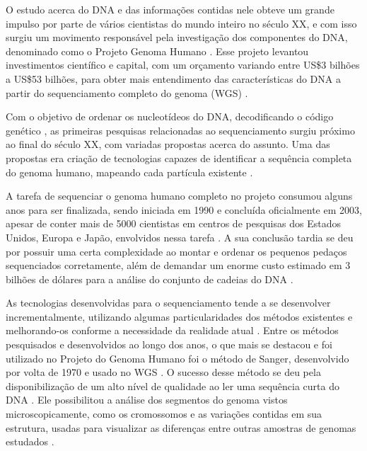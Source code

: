 O estudo acerca do DNA e das informações contidas nele obteve um grande impulso por parte de vários cientistas do mundo inteiro no século XX, e com isso surgiu um movimento responsável pela investigação dos componentes do DNA, denominado como o Projeto Genoma Humano \cite{Lander2001}. Esse projeto levantou investimentos científico e capital, com um orçamento variando entre US\$3 bilhões a US\$53 bilhões, para obter mais entendimento das características do DNA a partir do sequenciamento completo do genoma (WGS) \cite{Marian2011}.

Com o objetivo de ordenar os nucleotídeos do DNA, decodificando o código genético \cite{Edwards2011}, as primeiras pesquisas relacionadas ao sequenciamento surgiu próximo ao final do século XX, com variadas propostas acerca do assunto. Uma das propostas era criação de tecnologias capazes de identificar a sequência completa do genoma humano, mapeando cada partícula existente \cite{Lander2001,HutchisonIII2007}.

A tarefa de sequenciar o genoma humano completo no projeto consumou alguns anos para ser finalizada, sendo iniciada em 1990 e concluída oficialmente em 2003, apesar de conter mais de 5000 cientistas em centros de pesquisas dos Estados Unidos, Europa e Japão, envolvidos nessa tarefa \cite{HutchisonIII2007}. A sua conclusão tardia se deu por possuir uma certa complexidade ao montar e ordenar os pequenos pedaços sequenciados corretamente, além de demandar um enorme custo estimado em 3 bilhões de dólares para a análise do conjunto de cadeias do DNA \cite{Rye2017,HutchisonIII2007}.

As tecnologias desenvolvidas para o sequenciamento tende a se desenvolver incrementalmente, utilizando algumas particularidades dos métodos existentes e melhorando-os conforme a necessidade da realidade atual \cite{HutchisonIII2007}. Entre os métodos pesquisados e desenvolvidos ao longo dos anos, o que mais se destacou e foi utilizado no Projeto do Genoma Humano foi o método de Sanger, desenvolvido por volta de 1970 \cite{Sanger1975} e usado no WGS \cite{HutchisonIII2007}. O sucesso desse método se deu pela disponibilização de um alto nível de qualidade ao ler uma sequência curta do DNA \cite{Edwards2011}. Ele possibilitou a análise dos segmentos do genoma vistos microscopicamente, como os cromossomos e as variações contidas em sua estrutura, usadas para visualizar as diferenças entre outras amostras de genomas estudados \cite{Feuk2006,Sanger1975}.


